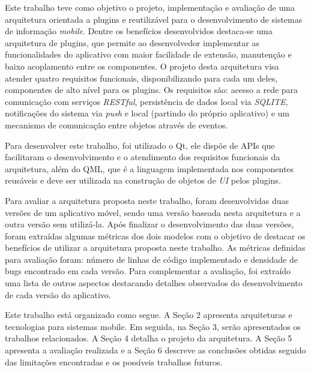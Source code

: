 Este trabalho teve como objetivo o projeto, implementação e avaliação de uma arquitetura orientada a plugins e reutilizável para o desenvolvimento de sistemas de informação \textit{mobile}. Dentre os benefícios desenvolvidos destaca-se uma arquitetura de plugins, que permite ao desenvolvedor implementar as funcionalidades do aplicativo com maior facilidade de extensão, manutenção e baixo acoplamento entre os componentes. O projeto desta arquitetura visa atender quatro requisitos funcionais, disponibilizando para cada um deles, componentes de alto nível para os plugins. Os requisitos são: acesso a rede para comunicação com serviços \textit{RESTful}, persistência de dados local via \textit{SQLITE}, notificações do sistema via \textit{push} e local (partindo do próprio aplicativo) e um mecanismo de comunicação entre objetos através de eventos.

Para desenvolver este trabalho, foi utilizado o Qt, ele dispõe de APIs que facilitaram o desenvolvimento e o atendimento dos requisitos funcionais da arquitetura, além do QML, que é a linguagem implementada nos componentes reusáveis e deve ser utilizada na construção de objetos de \textit{UI} pelos plugins.\par

Para avaliar a arquitetura proposta neste trabalho, foram desenvolvidas duas versões de um aplicativo móvel, sendo uma versão baseada nesta arquitetura e a outra versão sem utilizá-la. Após finalizar o desenvolvimento das duas versões, foram extraídas algumas métricas dos dois modelos com o objetivo de destacar os benefícios de utilizar a arquitetura proposta neste trabalho. As métricas definidas para avaliação foram: número de linhas de código implementado e densidade de bugs encontrado em cada versão. Para complementar a avaliação, foi extraído uma lista de outros aspectos destacando detalhes observados do desenvolvimento de cada versão do aplicativo.

Este trabalho está organizado como segue. A Seção 2 apresenta arquiteturas e tecnologias para sistemas mobile. Em seguida, na Seção 3, serão apresentados os trabalhos relacionados. A Seção 4 detalha o projeto da arquitetura. A Seção 5 apresenta a avaliação realizada e a Seção 6 descreve as conclusões obtidas seguido das limitações encontradas e os possíveis trabalhos futuros.